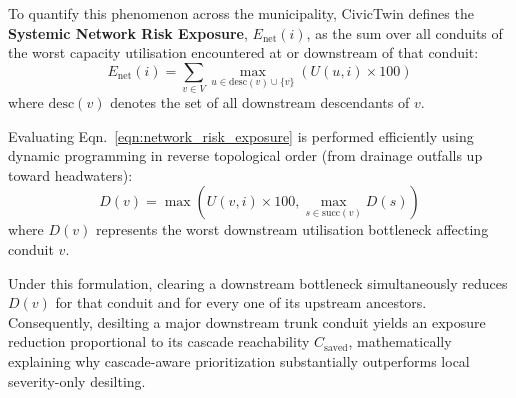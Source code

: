 To quantify this phenomenon across the municipality, CivicTwin defines the \textbf{Systemic Network Risk Exposure}, $E_{\text{net}}(i)$, as the sum over all conduits of the worst capacity utilisation encountered at or downstream of that conduit:
\begin{equation}
E_{\text{net}}(i) = \sum_{v \in V} \max_{u \in \text{desc}(v) \cup \{v\}} \left(U(u, i) \times 100\right)
\label{eqn:network_risk_exposure}
\end{equation}
where $\text{desc}(v)$ denotes the set of all downstream descendants of $v$. 

Evaluating Eqn.~\ref{eqn:network_risk_exposure} is performed efficiently using dynamic programming in reverse topological order (from drainage outfalls up toward headwaters):
\begin{equation}
D(v) = \max\left(U(v, i) \times 100, \max_{s \in \text{succ}(v)} D(s)\right)
\label{eqn:downstream_dp}
\end{equation}
where $D(v)$ represents the worst downstream utilisation bottleneck affecting conduit $v$.

Under this formulation, clearing a downstream bottleneck simultaneously reduces $D(v)$ for that conduit and for every one of its upstream ancestors. Consequently, desilting a major downstream trunk conduit yields an exposure reduction proportional to its cascade reachability $C_{\text{saved}}$, mathematically explaining why cascade-aware prioritization substantially outperforms local severity-only desilting.
